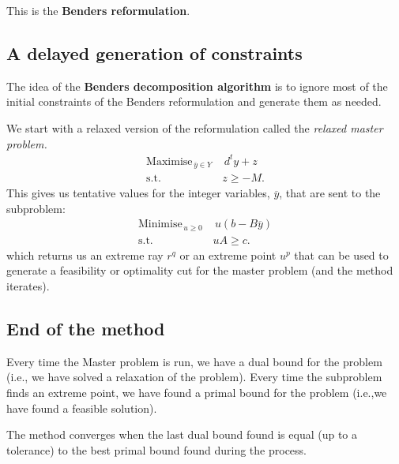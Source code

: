This is the \textbf{Benders reformulation}. 


\newpage

\subsection*{A delayed generation of constraints}

The idea of the \textbf{Benders decomposition algorithm} is to ignore most of the initial constraints of the Benders reformulation and generate them as needed. 

We start with a relaxed version of the reformulation called the \emph{relaxed master problem.}
\begin{align*}
\textrm{Maximise}_{\, \overline{y} \in Y \,}  & \,  d^ty + z \\
\textrm{s.t.} \quad & z \geq -M.
\end{align*}
\vspace{-.2cm}
This gives us tentative values for the integer variables, $\overline{y}$, that are sent to the subproblem:
\begin{align*}
\textrm{Minimise}_{\, u \geq 0 \,}  & \,  u(b-B\overline{y}) \\
\textrm{s.t.} \quad & uA \geq c.
\end{align*}
which returns us an extreme ray $r^q$ or an extreme point $u^p$ that can be used to generate a feasibility or optimality cut for the master problem (and the method iterates). 

\newpage

\subsection*{End of the method}

Every time the Master problem is run, we have a dual bound for the problem (i.e., we have solved a relaxation of the problem). Every time the subproblem finds an extreme point, we have found a primal bound for the problem (i.e.,we have found a feasible solution). 

The method converges when the last dual bound found is equal (up to a tolerance) to the best primal bound found during the process. 



